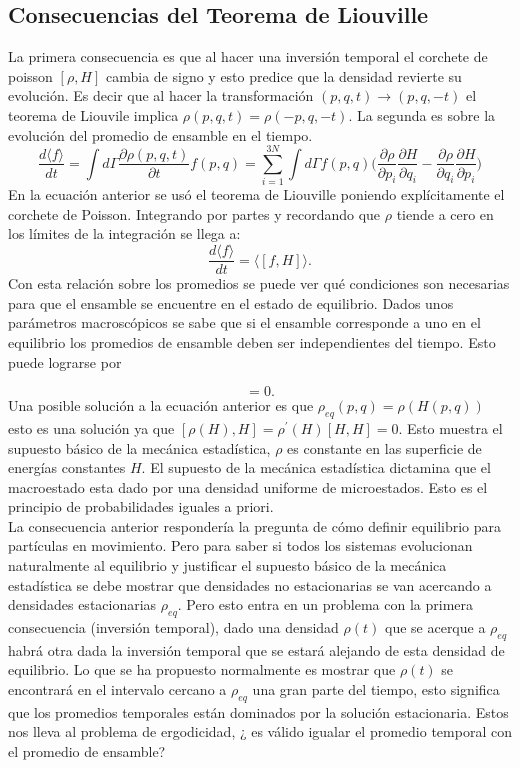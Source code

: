 \subsection{Consecuencias del Teorema de Liouville}
La primera consecuencia es que al hacer una inversión temporal el corchete de poisson $[\rho, H]$ cambia de signo y esto predice que la densidad revierte su evolución. Es decir que al hacer la transformación $(p,q,t) \to (p,q,-t)$ el teorema de Liouvile implica $\rho(p,q,t)=\rho(-p,q,-t)$.
La segunda es sobre la evolución del promedio de ensamble en el tiempo.
\begin{equation}
\frac{d \langle f \rangle}{dt}= \int d \Gamma \frac{\partial \rho(p,q,t)}{\partial t} f(p,q)= \sum_{i=1}^{3N} \int d\Gamma f(p,q) \Big( \frac{\partial \rho}{\partial p_{i}}\frac{\partial H}{\partial q_{i}} - \frac{\partial \rho}{\partial q_{i}}\frac{\partial H}{\partial p_{i}}  \Big)
\end{equation}
En la ecuación anterior se usó el teorema de Liouville poniendo explícitamente el corchete de Poisson. Integrando por partes y recordando que $\rho$ tiende a cero en los límites de la integración se llega a:
\begin{equation}
\frac{d \langle f \rangle}{dt}= \langle [f,H] \rangle.
\end{equation}
Con esta relación sobre los promedios se puede ver qué condiciones son necesarias para que el ensamble se encuentre en el estado de equilibrio. Dados unos parámetros macroscópicos se sabe que si el ensamble corresponde a uno en el equilibrio los promedios de ensamble deben ser independientes del tiempo. Esto puede lograrse por
 
\begin{equation}
[\rho_{eq}, H]=0.
\end{equation}
Una posible solución a la ecuación anterior es que $\rho_{eq}(p,q)=\rho(H(p,q))$ esto es una solución ya que $[\rho(H),H]=\rho^{'}(H)[H,H]=0$. Esto muestra el supuesto básico de la mecánica estadística, $\rho$ es constante en las superficie de energías constantes $H$. El supuesto de la mecánica estadística dictamina que el macroestado esta dado por una densidad uniforme de microestados. Esto es el principio de probabilidades iguales  a priori.
\\
La consecuencia anterior respondería la pregunta de cómo definir equilibrio para partículas en movimiento. Pero para saber si todos los sistemas evolucionan naturalmente al equilibrio  y justificar el supuesto básico de la mecánica estadística se debe mostrar que densidades no estacionarias se van acercando a densidades estacionarias $\rho_{eq}$. Pero esto entra en un problema con la primera consecuencia (inversión temporal), dado una densidad $\rho(t)$ que se acerque a $\rho_{eq}$ habrá otra dada la inversión temporal que se estará alejando de esta densidad de equilibrio. Lo que se ha propuesto normalmente es mostrar que $\rho(t)$ se encontrará en el intervalo cercano a $\rho_{eq}$ una gran parte del tiempo, esto significa que los promedios temporales están dominados por la solución estacionaria. Estos nos lleva al problema de ergodicidad, ¿ es válido igualar el promedio temporal con el promedio de ensamble?
\\

